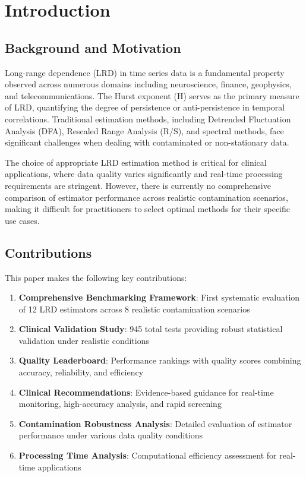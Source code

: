 \section{Introduction}

\subsection{Background and Motivation}

Long-range dependence (LRD) in time series data is a fundamental property observed across numerous domains including neuroscience, finance, geophysics, and telecommunications. The Hurst exponent (H) serves as the primary measure of LRD, quantifying the degree of persistence or anti-persistence in temporal correlations. Traditional estimation methods, including Detrended Fluctuation Analysis (DFA), Rescaled Range Analysis (R/S), and spectral methods, face significant challenges when dealing with contaminated or non-stationary data.

The choice of appropriate LRD estimation method is critical for clinical applications, where data quality varies significantly and real-time processing requirements are stringent. However, there is currently no comprehensive comparison of estimator performance across realistic contamination scenarios, making it difficult for practitioners to select optimal methods for their specific use cases.

\subsection{Contributions}

This paper makes the following key contributions:

\begin{enumerate}
    \item \textbf{Comprehensive Benchmarking Framework}: First systematic evaluation of 12 LRD estimators across 8 realistic contamination scenarios
    \item \textbf{Clinical Validation Study}: 945 total tests providing robust statistical validation under realistic conditions
    \item \textbf{Quality Leaderboard}: Performance rankings with quality scores combining accuracy, reliability, and efficiency
    \item \textbf{Clinical Recommendations}: Evidence-based guidance for real-time monitoring, high-accuracy analysis, and rapid screening
    \item \textbf{Contamination Robustness Analysis}: Detailed evaluation of estimator performance under various data quality conditions
    \item \textbf{Processing Time Analysis}: Computational efficiency assessment for real-time applications
\end{enumerate}

